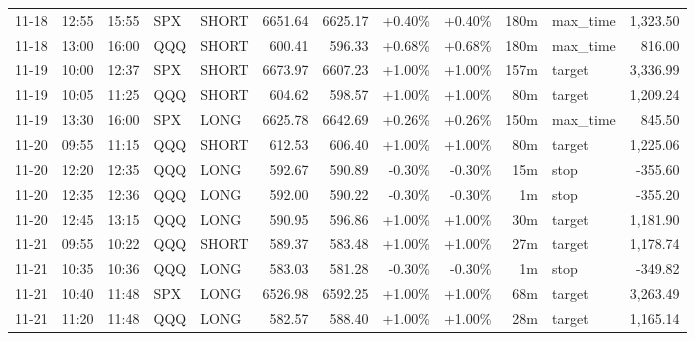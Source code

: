 \documentclass[11pt,a4paper,twoside]{article}
\begin{document}
\begin{center}
\begin{longtable}{>{\color{txtmain}}l l l l l r r r r r >{\color{txtmain}}l r}
11-18 & 12:55 & 15:55 & SPX & SHORT & 6651.64 & 6625.17 & \textcolor{wingreen}{+0.40\%} & \textcolor{wingreen}{+0.40\%} & 180m & max\_time & \textcolor{wingreen}{1,323.50} \\
11-18 & 13:00 & 16:00 & QQQ & SHORT & 600.41 & 596.33 & \textcolor{wingreen}{+0.68\%} & \textcolor{wingreen}{+0.68\%} & 180m & max\_time & \textcolor{wingreen}{816.00} \\
11-19 & 10:00 & 12:37 & SPX & SHORT & 6673.97 & 6607.23 & \textcolor{wingreen}{+1.00\%} & \textcolor{wingreen}{+1.00\%} & 157m & target & \textcolor{wingreen}{3,336.99} \\
11-19 & 10:05 & 11:25 & QQQ & SHORT & 604.62 & 598.57 & \textcolor{wingreen}{+1.00\%} & \textcolor{wingreen}{+1.00\%} & 80m & target & \textcolor{wingreen}{1,209.24} \\
11-19 & 13:30 & 16:00 & SPX & LONG & 6625.78 & 6642.69 & \textcolor{wingreen}{+0.26\%} & \textcolor{wingreen}{+0.26\%} & 150m & max\_time & \textcolor{wingreen}{845.50} \\
11-20 & 09:55 & 11:15 & QQQ & SHORT & 612.53 & 606.40 & \textcolor{wingreen}{+1.00\%} & \textcolor{wingreen}{+1.00\%} & 80m & target & \textcolor{wingreen}{1,225.06} \\
11-20 & 12:20 & 12:35 & QQQ & LONG & 592.67 & 590.89 & \textcolor{lossred}{-0.30\%} & \textcolor{lossred}{-0.30\%} & 15m & stop & \textcolor{lossred}{-355.60} \\
11-20 & 12:35 & 12:36 & QQQ & LONG & 592.00 & 590.22 & \textcolor{lossred}{-0.30\%} & \textcolor{lossred}{-0.30\%} & 1m & stop & \textcolor{lossred}{-355.20} \\
11-20 & 12:45 & 13:15 & QQQ & LONG & 590.95 & 596.86 & \textcolor{wingreen}{+1.00\%} & \textcolor{wingreen}{+1.00\%} & 30m & target & \textcolor{wingreen}{1,181.90} \\
11-21 & 09:55 & 10:22 & QQQ & SHORT & 589.37 & 583.48 & \textcolor{wingreen}{+1.00\%} & \textcolor{wingreen}{+1.00\%} & 27m & target & \textcolor{wingreen}{1,178.74} \\
11-21 & 10:35 & 10:36 & QQQ & LONG & 583.03 & 581.28 & \textcolor{lossred}{-0.30\%} & \textcolor{lossred}{-0.30\%} & 1m & stop & \textcolor{lossred}{-349.82} \\
11-21 & 10:40 & 11:48 & SPX & LONG & 6526.98 & 6592.25 & \textcolor{wingreen}{+1.00\%} & \textcolor{wingreen}{+1.00\%} & 68m & target & \textcolor{wingreen}{3,263.49} \\
11-21 & 11:20 & 11:48 & QQQ & LONG & 582.57 & 588.40 & \textcolor{wingreen}{+1.00\%} & \textcolor{wingreen}{+1.00\%} & 28m & target & \textcolor{wingreen}{1,165.14} \\

\end{longtable}
\end{center}
\end{document}
